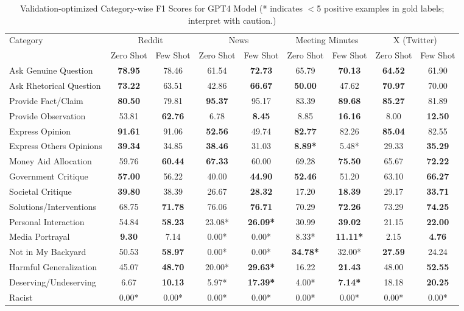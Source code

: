\begin{table}[htbp]
\centering
\begin{tabular}{l *{8}{c}}
\toprule
Category & \multicolumn{2}{c}{Reddit} & \multicolumn{2}{c}{News} & \multicolumn{2}{c}{Meeting Minutes} & \multicolumn{2}{c}{X (Twitter)} \\
& Zero Shot & Few Shot & Zero Shot & Few Shot & Zero Shot & Few Shot & Zero Shot & Few Shot \\
\midrule
Ask Genuine Question & \textbf{78.95} & 78.46 & 61.54 & \textbf{72.73} & 65.79 & \textbf{70.13} & \textbf{64.52} & 61.90 \\
Ask Rhetorical Question & \textbf{73.22} & 63.51 & 42.86 & \textbf{66.67} & \textbf{50.00} & 47.62 & \textbf{70.97} & 70.00 \\
Provide Fact/Claim & \textbf{80.50} & 79.81 & \textbf{95.37} & 95.17 & 83.39 & \textbf{89.68} & \textbf{85.27} & 81.89 \\
Provide Observation & 53.81 & \textbf{62.76} & 6.78 & \textbf{8.45} & 8.85 & \textbf{16.16} & 8.00 & \textbf{12.50} \\
Express Opinion & \textbf{91.61} & 91.06 & \textbf{52.56} & 49.74 & \textbf{82.77} & 82.26 & \textbf{85.04} & 82.55 \\
Express Others Opinions & \textbf{39.34} & 34.85 & \textbf{38.46} & 31.03 & \textbf{8.89*} & 5.48* & 29.33 & \textbf{35.29} \\
Money Aid Allocation & 59.76 & \textbf{60.44} & \textbf{67.33} & 60.00 & 69.28 & \textbf{75.50} & 65.67 & \textbf{72.22} \\
Government Critique & \textbf{57.00} & 56.22 & 40.00 & \textbf{44.90} & \textbf{52.46} & 51.20 & 63.10 & \textbf{66.27} \\
Societal Critique & \textbf{39.80} & 38.39 & 26.67 & \textbf{28.32} & 17.20 & \textbf{18.39} & 29.17 & \textbf{33.71} \\
Solutions/Interventions & 68.75 & \textbf{71.78} & 76.06 & \textbf{76.71} & 70.29 & \textbf{72.26} & 73.29 & \textbf{74.25} \\
Personal Interaction & 54.84 & \textbf{58.23} & 23.08* & \textbf{26.09*} & 30.99 & \textbf{39.02} & 21.15 & \textbf{22.00} \\
Media Portrayal & \textbf{9.30} & 7.14 & 0.00* & 0.00* & 8.33* & \textbf{11.11*} & 2.15 & \textbf{4.76} \\
Not in My Backyard & 50.53 & \textbf{58.97} & 0.00* & 0.00* & \textbf{34.78*} & 32.00* & \textbf{27.59} & 24.24 \\
Harmful Generalization & 45.07 & \textbf{48.70} & 20.00* & \textbf{29.63*} & 16.22 & \textbf{21.43} & 48.00 & \textbf{52.55} \\
Deserving/Undeserving & 6.67 & \textbf{10.13} & 5.97* & \textbf{17.39*} & 4.00* & \textbf{7.14*} & 18.18 & \textbf{20.25} \\
Racist & 0.00* & 0.00* & 0.00* & 0.00* & 0.00* & 0.00* & 0.00* & 0.00* \\
\bottomrule
\end{tabular}
\centering\caption{Validation-optimized Category-wise F1 Scores for GPT4 Model (* indicates $<$5 positive examples in gold labels; interpret with caution.)}
\label{tab:gpt4_category_breakdown}
\end{table}